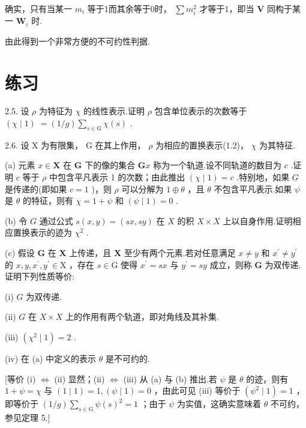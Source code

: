确实，只有当某一 \({m}_{i}\) 等于1而其余等于0时， \(\sum {m}_{i}^{2}\) 才等于1，即当 \(\mathbf{V}\) 同构于某一 \({\mathbf{W}}_{i}\) 时.

由此得到一个非常方便的不可约性判据.

\section*{练习}

2.5. 设 \(\rho\) 为特征为 \(\chi\) 的线性表示.证明 \(\rho\) 包含单位表示的次数等于 \(\left( {\chi  \mid  1}\right) \; = \left( {1/g}\right) \mathop{\sum }\limits_{{s \in  \mathrm{G}}}\chi \left( s\right)\) .

2.6. 设 \(\mathrm{X}\) 为有限集， \(\mathrm{G}\) 在其上作用， \(\rho\) 为相应的置换表示(1.2)， \(\chi\) 为其特征.

(a) 元素 \(x \in  \mathbf{X}\) 在 \(\mathbf{G}\) 下的像的集合 \(\mathbf{G}x\) 称为一个轨道.设不同轨道的数目为 \(c\) .证明 \(c\) 等于 \(\rho\) 中包含平凡表示 1 的次数；由此推出 \(\left( {\chi  \mid  1}\right)  = c\) .特别地，如果 \(G\) 是传递的(即如果 \(c = 1\) )，则 \(\rho\) 可以分解为 \(1 \oplus  \theta\) ，且 \(\theta\) 不包含平凡表示.如果 \(\psi\) 是 \(\theta\) 的特征，则有 \(\chi  = 1 + \psi\) 和 \(\left( {\psi  \mid  1}\right)  = 0\) .

(b) 令 \(G\) 通过公式 \(s\left( {x,y}\right)  = \left( {{sx},{sy}}\right)\) 在 \(X\) 的积 \(X \times  X\) 上以自身作用.证明相应置换表示的迹为 \({\chi }^{2}\) .

(c) 假设 \(\mathbf{G}\) 在 \(\mathbf{X}\) 上传递，且 \(\mathbf{X}\) 至少有两个元素.若对任意满足 \(x \neq  y\) 和 \({x}^{\prime } \neq  {y}^{\prime }\) 的 \(x,y,{x}^{\prime },{y}^{\prime } \in  \mathrm{X}\) ，存在 \(s \in  \mathrm{G}\) 使得 \({x}^{\prime } = {sx}\) 与 \({y}^{\prime } = {sy}\) 成立，则称 \(\mathbf{G}\) 为双传递.证明下列性质等价:

(i) \(G\) 为双传递.

(ii) \(G\) 在 \(X \times  X\) 上的作用有两个轨道，即对角线及其补集.

(iii) \(\left( {{\chi }^{2} \mid  1}\right)  = 2\) .

(iv) 在 (a) 中定义的表示 \(\theta\) 是不可约的.

[等价 (i) \(\Leftrightarrow\) (ii) 显然；(ii) \(\Leftrightarrow\) (iii) 从 (a) 与 (b) 推出.若 \(\psi\) 是 \(\theta\) 的迹，则有 \(1 + \psi  = \chi\) 与 \(\left( {1 \mid  1}\right)  = 1,\left( {\psi  \mid  1}\right)  = 0\) ，由此可见 (iii) 等价于 \(\left( {{\psi }^{2} \mid  1}\right)  = 1\) ，即等价于 \(\left( {1/g}\right) \mathop{\sum }\limits_{{s \in  \mathrm{G}}}\psi {\left( s\right) }^{2} = 1\) ；由于 \(\psi\) 为实值，这确实意味着 \(\theta\) 不可约，参见定理 5.]

